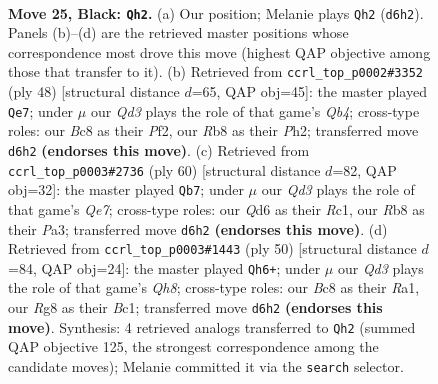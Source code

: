 \documentclass[11pt]{article}
\begin{document}
\clearpage

\begin{figure}[p]\centering
\begin{subfigure}{0.46\textwidth}\centering
\resizebox{\linewidth}{!}{%
\newchessgame
\chessboard[
  setfen={1rbk2r1/p1p2p2/2pqp2p/2P3p1/8/3BQ3/P7/R2KR3 b - - 0 25},
  showmover=false,
  pgfstyle=straightmove, color=movearrow, markmove={d6-h2}
]}
\caption{}
\end{subfigure}\hfill
\begin{subfigure}{0.46\textwidth}\centering
\resizebox{\linewidth}{!}{%
\newchessgame
\chessboard[
  setfen={3r2k1/p5bp/6p1/1P1q4/1Qr1p1R1/P3P1B1/1P3P1P/R3K3 w Q - 4 25},
  showmover=false,
  pgfstyle=straightmove, color=movearrow, markmove={b4-e7}
]}
\caption{}
\end{subfigure}
\\[4pt]
\begin{subfigure}{0.46\textwidth}\centering
\resizebox{\linewidth}{!}{%
\newchessgame
\chessboard[
  setfen={2r1r1k1/p3Q2p/6q1/3pB3/3P4/P1nbP3/5PPP/2R1R2K w - - 3 31},
  showmover=false,
  pgfstyle=straightmove, color=movearrow, markmove={e7-b7}
]}
\caption{}
\end{subfigure}\hfill
\begin{subfigure}{0.46\textwidth}\centering
\resizebox{\linewidth}{!}{%
\newchessgame
\chessboard[
  setfen={2r2krQ/p2qbp2/6b1/8/8/6P1/PP1P1P1P/R1B1R1K1 w - - 2 26},
  showmover=false,
  pgfstyle=straightmove, color=movearrow, markmove={h8-h6}
]}
\caption{}
\end{subfigure}
\caption{\textbf{Move 25, Black: \texttt{Qh2}.} (a) Our position; Melanie plays \texttt{Qh2} (\texttt{d6h2}). Panels (b)--(d) are the retrieved master positions whose correspondence most drove this move (highest QAP objective among those that transfer to it). (b) Retrieved from \texttt{ccrl\_top\_p0002\#3352} (ply 48) [structural distance $d$=65, QAP obj=45]: the master played \texttt{Qe7}; under $\mu$ our \emph{Qd3} plays the role of that game's \emph{Qb4}; cross-type roles: our \emph{B}c8 as their \emph{P}f2, our \emph{R}b8 as their \emph{P}h2; transferred move \texttt{d6h2} \textbf{(endorses this move)}. (c) Retrieved from \texttt{ccrl\_top\_p0003\#2736} (ply 60) [structural distance $d$=82, QAP obj=32]: the master played \texttt{Qb7}; under $\mu$ our \emph{Qd3} plays the role of that game's \emph{Qe7}; cross-type roles: our \emph{Q}d6 as their \emph{R}c1, our \emph{R}b8 as their \emph{P}a3; transferred move \texttt{d6h2} \textbf{(endorses this move)}. (d) Retrieved from \texttt{ccrl\_top\_p0003\#1443} (ply 50) [structural distance $d$=84, QAP obj=24]: the master played \texttt{Qh6+}; under $\mu$ our \emph{Qd3} plays the role of that game's \emph{Qh8}; cross-type roles: our \emph{B}c8 as their \emph{R}a1, our \emph{R}g8 as their \emph{B}c1; transferred move \texttt{d6h2} \textbf{(endorses this move)}. Synthesis: 4 retrieved analogs transferred to \texttt{Qh2} (summed QAP objective 125, the strongest correspondence among the candidate moves); Melanie committed it via the \texttt{search} selector.}
\label{fig:thought-m49}
\end{figure}
\end{document}
